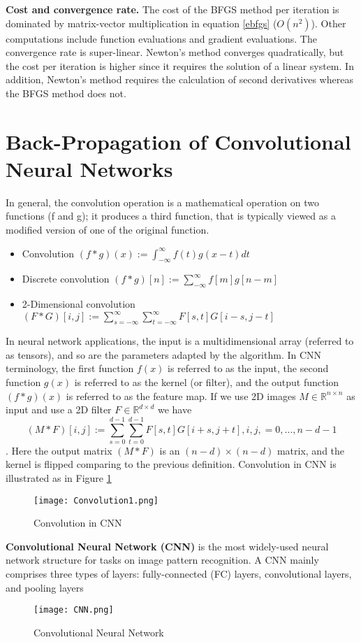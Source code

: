 {\bf Cost and convergence rate.} The cost of the BFGS method per iteration is dominated by matrix-vector multiplication in equation \eqref{ebfgs} ($O(n^2)$). Other computations include function evaluations and gradient evaluations. The convergence rate is super-linear. Newton's method converges quadratically, but the cost per iteration is higher since it requires the solution of a linear system. In addition, Newton's method requires the calculation of second derivatives whereas the BFGS method does not.








\section{Back-Propagation of Convolutional Neural Networks}

In general, the convolution operation is a mathematical operation on two functions (f and g); it produces a third function, that is typically viewed as a modified version of one of the original function.

\begin{itemize}
\item
Convolution
$(f*g)(x) := \int_{-\infty}^{\infty}f(t)g(x-t)dt$
\item
Discrete convolution
$(f*g)[n] := \sum_{-\infty}^\infty f[m]g[n-m]$
\item
2-Dimensional convolution
$(F*G)[i,j] := \sum_{s = -\infty}^\infty\sum_{t = -\infty}^\infty F[s, t]G[i-s, j-t]$
\end{itemize} 

In neural network applications, the input is a multidimensional array (referred to as tensors), and so are the parameters adapted by the algorithm. In CNN terminology, the first function $f(x)$ is referred to as the input, the second function $g(x)$ is referred to as the kernel (or filter), and the output function $(f*g)(x)$ is referred to as the feature map. If we use 2D images $M\in\mathbb{R}^{n\times n}$ as input and use a 2D filter $F\in\mathbb{R}^{d\times d}$ we have
$$(M*F)[i,j] := \sum_{s = 0}^{d-1}\sum_{t=0}^{d-1} F[s, t]G[i+s, j+t], i,j,=0,...,n-d-1$$. Here the output matrix $(M*F)$ is an $(n-d)\times(n-d)$ matrix, and the kernel is flipped comparing to the previous definition. Convolution in CNN is illustrated as in Figure \ref{fconv}
\begin{figure}[ht]
\label{fconv}
\centering
\texttt{[image: Convolution1.png]}
\caption{Convolution in CNN}
\end{figure}
{\bf Convolutional Neural Network (CNN)} is the most widely-used neural network structure for tasks on image pattern recognition. A CNN mainly comprises three types of layers: fully-connected (FC) layers, convolutional layers, and pooling layers
\begin{figure}[ht]
\centering
\texttt{[image: CNN.png]}
\caption{Convolutional Neural Network}
\end{figure}

